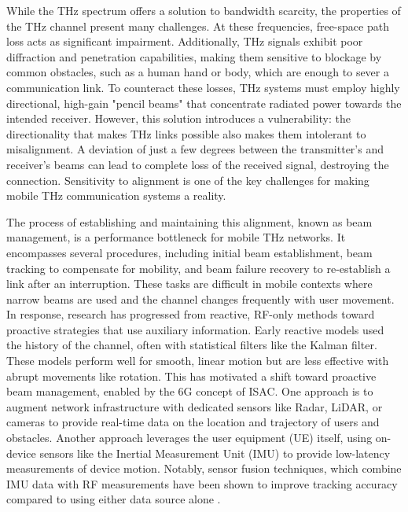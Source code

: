 \documentclass[fleqn,10pt]{wlscirep}
\begin{document}
While the THz spectrum offers a solution to bandwidth scarcity, the properties of the THz channel present many challenges. At these frequencies, free-space path loss acts as significant impairment\cite{10422992, Yu2025Research, Kleine-Ostmann2011}. Additionally, THz signals exhibit poor diffraction and penetration capabilities, making them sensitive to blockage by common obstacles, such as a human hand or body, which are enough to sever a communication link\cite{10494372, Jornet2023}. To counteract these losses, THz systems must employ highly directional, high-gain "pencil beams" that concentrate radiated power towards the intended receiver\cite{Kleine-Ostmann2011}. However, this solution introduces a vulnerability: the directionality that makes THz links possible also makes them intolerant to misalignment. A deviation of just a few degrees between the transmitter's and receiver's beams can lead to complete loss of the received signal, destroying the connection. Sensitivity to alignment is one of the key challenges for making mobile THz communication systems a reality\cite{10036372, Petrov2023Mobile, Azari2022}.

The process of establishing and maintaining this alignment, known as beam management, is a performance bottleneck for mobile THz networks. It encompasses several procedures, including initial beam establishment, beam tracking to compensate for mobility, and beam failure recovery to re-establish a link after an interruption\cite{Giordani2018ATO, 10422712, Wang2022}. These tasks are difficult in mobile contexts where narrow beams are used and the channel changes frequently with user movement\cite{9536953, smartcities8040105}. In response, research has progressed from reactive, RF-only methods toward proactive strategies that use auxiliary information. Early reactive models used the history of the channel, often with statistical filters like the Kalman filter\cite{8455289,9145366,10067030, 10123123}. These models perform well for smooth, linear motion but are less effective with abrupt movements like rotation\cite{Wang2022}. This has motivated a shift toward proactive beam management, enabled by the 6G concept of ISAC\cite{10494372, Azari2022, Nokia2022, Chen2023, Jornet2023}. One approach is to augment network infrastructure with dedicated sensors like Radar, LiDAR, or cameras to provide real-time data on the location and trajectory of users and obstacles\cite{10422712,5GPPP_Automotive_Vision_2015}. Another approach leverages the user equipment (UE) itself, using on-device sensors like the Inertial Measurement Unit (IMU) to provide low-latency measurements of device motion. Notably, sensor fusion techniques, which combine IMU data with RF measurements have been shown to improve tracking accuracy compared to using either data source alone \cite{10036372,9391649,electronics8020142, s21082723, 9814507}.
\end{document}
